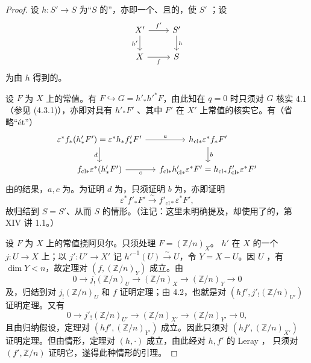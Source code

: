\begin{proof}
设 $h:S'\to S$ 为“$S$ 的”，亦即一个、且的，使 $S'$ ；设
\[
\begin{tikzcd}
X'\arrow[r,"f'"]\arrow[d,"h'"']&S'\arrow[d,"h"]\\
X\arrow[r,"f"']&S
\end{tikzcd}
\]
为由 $h$ 得到的。

设 $F$ 为 $X$ 上的常值。有 $F\hookrightarrow G=h'_*h'^*F$，由此知在 $q=0$ 时只须对 $G$ 核实 4.1（参见 (4.3.1)），亦即对具有 $h'_*F'$ 、其中 $F'$ 在 $X'$ 上常值的核实它。有（省略“ét”）
\[
\begin{tikzcd}[column sep=small]
\varepsilon^*f_*(h'_*F')=\varepsilon^*h_*f'_*F'\arrow[r,"a"]\arrow[d,"d"']&h_{\mathrm{cl}*}\varepsilon^*f_*F'\arrow[d,"b"]\\
f_{\mathrm{cl}*}\varepsilon^*(h'_*F')\arrow[r,"c"']&f_{\mathrm{cl}*}h'_{\mathrm{cl}*}\varepsilon^*F'=h_{\mathrm{cl}*}f'_{\mathrm{cl}*}\varepsilon^*F'
\end{tikzcd}
\]
由的结果，$a,c$ 为。为证明 $d$ 为，只须证明 $b$ 为，亦即证明
\[
\varepsilon^*f'_*F'\xrightarrow{\sim}f'_{\mathrm{cl}*}\varepsilon^*F',
\]
故归结到 $S=S'$、从而 $S$ 的情形。（注记：这里未明确提及，却使用了的，第 XIV 讲 1.1。）

设 $F$ 为 $X$ 上的常值挠阿贝尔。只须处理 $F=(\mathbb Z/n)_X$。 $h'$ 在 $X$ 的一个 $j:U\to X$ 上；以 $j':U'\to X'$ 记 $h'^{-1}(U)\xrightarrow{\sim}U$，令 $Y=X-U$。因 $U$ ，有 $\dim Y<n$，故定理对 $(f,(\mathbb Z/n)_Y)$ 成立。由
\[
0\longrightarrow j_!(\mathbb Z/n)_U\longrightarrow(\mathbb Z/n)_X\longrightarrow(\mathbb Z/n)_Y\longrightarrow0
\]
及，归结到对 $j_!(\mathbb Z/n)_U$ 和 $f$ 证明定理；由 4.2，也就是对 $(hf',j'_!(\mathbb Z/n)_{U'})$ 证明定理。又有
\[
0\longrightarrow j'_!(\mathbb Z/n)_{U'}\longrightarrow(\mathbb Z/n)_{X'}\longrightarrow(\mathbb Z/n)_{Y'}\longrightarrow0,
\]
且由归纳假设，定理对 $(hf',(\mathbb Z/n)_{Y'})$ 成立。因此只须对 $(hf',(\mathbb Z/n)_{X'})$ 证明定理。但由情形，定理对 $(h,\cdot)$ 成立，由此经对 $h,f'$ 的 Leray ，
只须对 $(f',\mathbb Z/n)$ 证明它，遂得此种情形的引理。


\end{proof}
